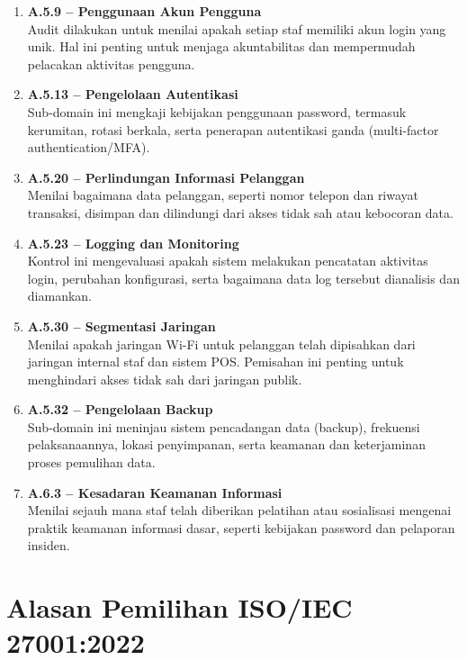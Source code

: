\documentclass[12pt, a4paper]{report}
\begin{document}
\begin{enumerate}
    \item \textbf{A.5.9 – Penggunaan Akun Pengguna}\\
    Audit dilakukan untuk menilai apakah setiap staf memiliki akun login yang unik. Hal ini penting untuk menjaga akuntabilitas dan mempermudah pelacakan aktivitas pengguna.

    \item \textbf{A.5.13 – Pengelolaan Autentikasi}\\
    Sub-domain ini mengkaji kebijakan penggunaan password, termasuk kerumitan, rotasi berkala, serta penerapan autentikasi ganda (multi-factor authentication/MFA).

    \item \textbf{A.5.20 – Perlindungan Informasi Pelanggan}\\
    Menilai bagaimana data pelanggan, seperti nomor telepon dan riwayat transaksi, disimpan dan dilindungi dari akses tidak sah atau kebocoran data.

    \item \textbf{A.5.23 – Logging dan Monitoring}\\
    Kontrol ini mengevaluasi apakah sistem melakukan pencatatan aktivitas login, perubahan konfigurasi, serta bagaimana data log tersebut dianalisis dan diamankan.

    \item \textbf{A.5.30 – Segmentasi Jaringan}\\
    Menilai apakah jaringan Wi-Fi untuk pelanggan telah dipisahkan dari jaringan internal staf dan sistem POS. Pemisahan ini penting untuk menghindari akses tidak sah dari jaringan publik.

    \item \textbf{A.5.32 – Pengelolaan Backup}\\
    Sub-domain ini meninjau sistem pencadangan data (backup), frekuensi pelaksanaannya, lokasi penyimpanan, serta keamanan dan keterjaminan proses pemulihan data.

    \item \textbf{A.6.3 – Kesadaran Keamanan Informasi}\\
    Menilai sejauh mana staf telah diberikan pelatihan atau sosialisasi mengenai praktik keamanan informasi dasar, seperti kebijakan password dan pelaporan insiden.
\end{enumerate}

\section{Alasan Pemilihan ISO/IEC 27001:2022}
\end{document}

